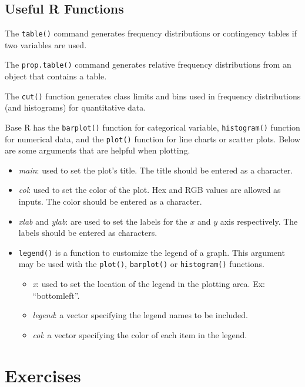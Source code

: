 \documentclass[
  letterpaper,
  DIV=11,
  numbers=noendperiod]{scrreprt}
\providecommand{\tightlist}{%
  \setlength{\itemsep}{0pt}\setlength{\parskip}{0pt}}\usepackage{longtable,booktabs,array}
\begin{document}
\hypertarget{useful-r-functions-1}{%
\subsection*{Useful R Functions}\label{useful-r-functions-1}}

The \texttt{table()} command generates frequency distributions or
contingency tables if two variables are used.

The \texttt{prop.table()} command generates relative frequency
distributions from an object that contains a table.

The \texttt{cut()} function generates class limits and bins used in
frequency distributions (and histograms) for quantitative data.

Base R has the \texttt{barplot()} function for categorical variable,
\texttt{histogram()} function for numerical data, and the
\texttt{plot()} function for line charts or scatter plots. Below are
some arguments that are helpful when plotting.

\begin{itemize}
\tightlist
\item
  \emph{main}: used to set the plot's title. The title should be entered
  as a character.
\item
  \emph{col}: used to set the color of the plot. Hex and RGB values are
  allowed as inputs. The color should be entered as a character.
\item
  \emph{xlab} and \emph{ylab}: are used to set the labels for the \(x\)
  and \(y\) axis respectively. The labels should be entered as
  characters.
\item
  \texttt{legend()} is a function to customize the legend of a graph.
  This argument may be used with the \texttt{plot()}, \texttt{barplot()}
  or \texttt{histogram()} functions.

  \begin{itemize}
  \tightlist
  \item
    \emph{x}: used to set the location of the legend in the plotting
    area. Ex: ``bottomleft''.
  \item
    \emph{legend}: a vector specifying the legend names to be included.
  \item
    \emph{col}: a vector specifying the color of each item in the
    legend.
  \end{itemize}
\end{itemize}

\hypertarget{exercises-1}{%
\section{Exercises}\label{exercises-1}}
\end{document}
